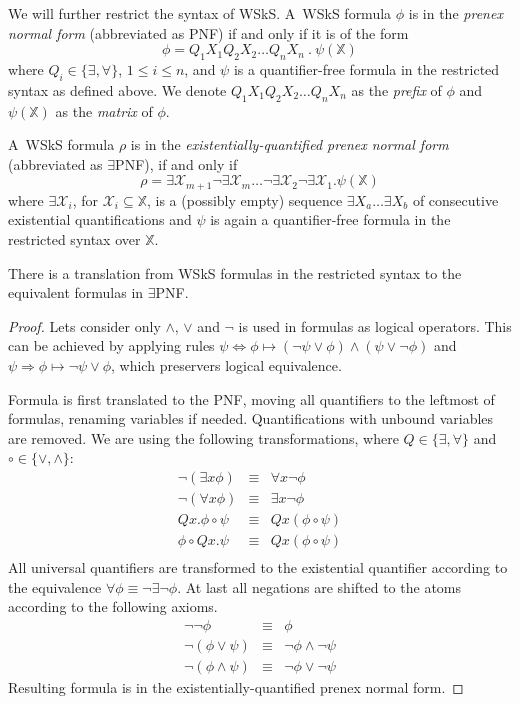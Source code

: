 	We will further restrict the syntax of WSkS. A~WSkS formula $\phi$ is in the \emph{prenex normal form} (abbreviated as PNF) if and only if it is of the form $$\phi = Q_1X_1Q_2X_2\ldots Q_nX_n\ .\ \psi(\mathds{X})$$ where  $Q_i \in \{\exists,\forall\}$, $1 \leq i \leq n$, and $\psi$ is a quantifier-free formula in the restricted syntax as defined above. We denote $Q_1X_1Q_2X_2\ldots Q_nX_n$ as the \emph{prefix} of $\phi$ and $\psi(\mathds{X})$ as the \emph{matrix} of $\phi$.
	
	A~WSkS formula $\rho$ is in the \emph{existentially-quantified prenex normal form} (abbreviated as $\exists$PNF), if and only if $$\rho = \exists \mathcal{X}_{m+1}\neg\exists \mathcal{X}_m\ldots\neg\exists \mathcal{X}_2\neg\exists \mathcal{X}_1.\psi(\mathds{X})$$ where $\exists\mathcal{X}_i$, for $\mathcal{X}_i \subseteq \mathds{X}$, is a (possibly empty) sequence $\exists X_a\ldots\exists X_b$ of consecutive existential quantifications and $\psi$ is again a quantifier-free formula in the restricted syntax over $\mathds{X}$.
	
	\begin{prop}
	 There is a translation from WSkS formulas in the restricted syntax to the equivalent formulas in $\exists$PNF. 
	\end{prop}
	
	\begin{proof}
	 Lets consider only $\wedge$, $\vee$ and $\neg$ is used in formulas as logical operators. This can be achieved by applying rules $\psi \Leftrightarrow \phi \mapsto (\neg \psi \vee \phi) \wedge (\psi \vee \neg \phi)$ and $\psi \Rightarrow \phi \mapsto \neg \psi \vee \phi$, which preservers logical equivalence.
	
	Formula is first translated to the PNF, moving all quantifiers to the leftmost of formulas, renaming variables if needed. Quantifications with unbound variables are removed. We are using the following transformations, where $Q \in \{\exists, \forall\}$ and $\circ \in \{\vee, \wedge\}$:
	\begin{eqnarray*}
	 \neg(\exists x \phi) & \equiv & \forall x\neg \phi\\
	 \neg(\forall x \phi) & \equiv & \exists x\neg \phi\\
	 Qx.\phi \circ \psi & \equiv & Qx(\phi \circ \psi)\\
	 \phi \circ Qx.\psi & \equiv & Qx(\phi \circ \psi)\\
	\end{eqnarray*}
	All universal quantifiers are transformed to the existential quantifier according to the equivalence $\forall \phi \equiv \neg\exists\neg\phi$. At last all negations are shifted to the atoms according to the following axioms.
	\begin{eqnarray*}
	 \neg\neg\phi & \equiv & \phi\\
	 \neg(\phi\vee \psi) & \equiv & \neg \phi \wedge \neg \psi\\
	 \neg(\phi\wedge \psi) & \equiv & \neg \phi \vee \neg \psi 
	\end{eqnarray*}
 Resulting formula is in the existentially-quantified prenex normal form. 
	\end{proof}
	
